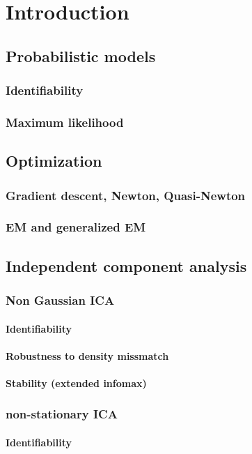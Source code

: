 \documentclass[12pt]{report}
\begin{document}
\chapter{Introduction}
\section{Probabilistic models}
\subsection{Identifiability}
\subsection{Maximum likelihood}
\section{Optimization}
\subsection{Gradient descent, Newton, Quasi-Newton}
\subsection{EM and generalized EM}
\section{Independent component analysis}
\subsection{Non Gaussian ICA}
\subsubsection{Identifiability}
\subsubsection{Robustness to density missmatch}
\subsubsection{Stability (extended infomax)}
\subsection{non-stationary ICA}
\subsubsection{Identifiability}
\end{document}
